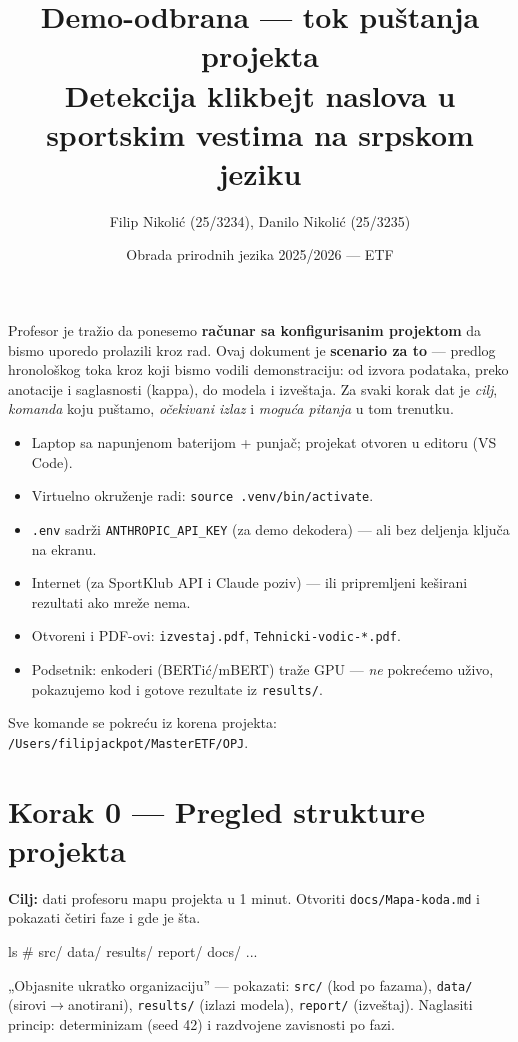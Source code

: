 \documentclass[11pt,a4paper]{article}
\title{\textbf{Demo-odbrana --- tok puštanja projekta}\\[2pt]
\large Detekcija klikbejt naslova u sportskim vestima na srpskom jeziku}
\author{Filip Nikolić (25/3234), Danilo Nikolić (25/3235)}
\date{Obrada prirodnih jezika 2025/2026 --- ETF}
\newcommand{\kod}[1]{\texttt{#1}}
\begin{document}
\maketitle

\noindent
Profesor je tražio da ponesemo \textbf{računar sa konfigurisanim projektom} da bismo
uporedo prolazili kroz rad. Ovaj dokument je \textbf{scenario za to} --- predlog
hronološkog toka kroz koji bismo vodili demonstraciju: od izvora podataka, preko
anotacije i saglasnosti (kappa), do modela i izveštaja. Za svaki korak dat je
\emph{cilj}, \emph{komanda} koju puštamo, \emph{očekivani izlaz} i \emph{moguća
pitanja} u tom trenutku.

\begin{tcolorbox}[colback=blue!4, colframe=blue!45!black, title={\bfseries Pre dolaska --- ček-lista},fontupper=\small]
\begin{itemize}[nosep]
  \item Laptop sa napunjenom baterijom + punjač; projekat otvoren u editoru (VS Code).
  \item Virtuelno okruženje radi: \kod{source .venv/bin/activate}.
  \item \kod{.env} sadrži \kod{ANTHROPIC\_API\_KEY} (za demo dekodera) --- ali bez
    deljenja ključa na ekranu.
  \item Internet (za SportKlub API i Claude poziv) --- ili pripremljeni keširani
    rezultati ako mreže nema.
  \item Otvoreni i PDF-ovi: \kod{izvestaj.pdf}, \kod{Tehnicki-vodic-*.pdf}.
  \item Podsetnik: enkoderi (BERTić/mBERT) traže GPU --- \emph{ne} pokrećemo uživo,
    pokazujemo kod i gotove rezultate iz \kod{results/}.
\end{itemize}
\end{tcolorbox}

Sve komande se pokreću iz korena projekta: \kod{/Users/filipjackpot/MasterETF/OPJ}.

\section{Korak 0 --- Pregled strukture projekta}
\textbf{Cilj:} dati profesoru mapu projekta u 1 minut. Otvoriti
\kod{docs/Mapa-koda.md} i pokazati četiri faze i gde je šta.
\begin{cmd}
ls                       # src/ data/ results/ report/ docs/ ...
\end{cmd}
\begin{pita}
„Objasnite ukratko organizaciju'' --- pokazati: \kod{src/} (kod po fazama),
\kod{data/} (sirovi$\to$anotirani), \kod{results/} (izlazi modela), \kod{report/}
(izveštaj). Naglasiti princip: determinizam (seed 42) i razdvojene zavisnosti po fazi.
\end{pita}
\end{document}
